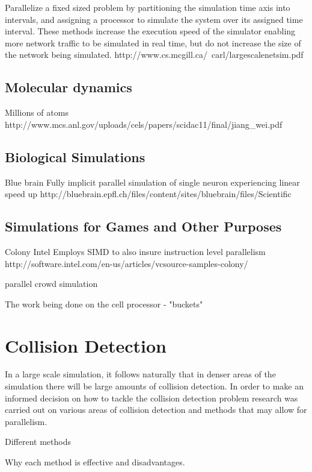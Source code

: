 \documentclass[main.tex]{subfiles}
\begin{document}
{{Parallelize a fixed sized problem by partitioning the simulation time axis into intervals, and assigning a processor to simulate the system over its assigned time interval.  These methods increase the execution speed of the simulator enabling more network traffic to be simulated in real time, but do not increase the size of the network being simulated.
http://www.cs.mcgill.ca/~carl/largescalenetsim.pdf

\subsection{Molecular dynamics}
Millions of atoms http://www.mcs.anl.gov/uploads/cels/papers/scidac11/final/jiang_wei.pdf

\subsection{Biological Simulations}
Blue brain
Fully implicit parallel simulation of single neuron
experiencing linear speed up
http://bluebrain.epfl.ch/files/content/sites/bluebrain/files/Scientific%

\subsection{Simulations for Games and Other Purposes}

Colony Intel
Employs SIMD to also insure instruction level parallelism
http://software.intel.com/en-us/articles/vcsource-samples-colony/

parallel crowd simulation

The work being done on the cell processor - "buckets"


\section {Collision Detection}

In a large scale simulation, it follows naturally that in denser areas of the simulation there will be large amounts of collision detection. In order to make an informed decision on how to tackle the collision detection problem research was carried out on various areas of collision detection and methods that may allow for parallelism.

Different methods

Why each method is effective and disadvantages.

}}
\end{document}
